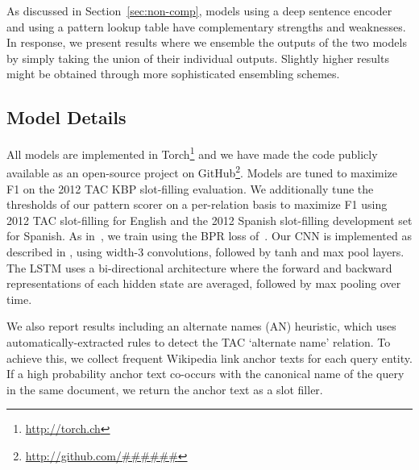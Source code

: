 
As discussed in Section~\ref{sec:non-comp}, models using a deep sentence encoder and using a pattern lookup table have complementary strengths and weaknesses. In response, we present results where we ensemble the outputs of the two models by simply taking the union of their individual outputs. Slightly higher results might be obtained through more sophisticated ensembling schemes. %


\subsection {Model Details \label{sec:models}}
All models are implemented in Torch\footnote{\url{http://torch.ch}} and we have made the code publicly available as an open-source project on GitHub\footnote{\url{http://github.com/######}}. Models are tuned to maximize F1 on the 2012 TAC KBP slot-filling evaluation. We additionally tune the thresholds of our pattern scorer on a per-relation basis to maximize F1 using 2012 TAC slot-filling for English and the 2012 Spanish slot-filling development set for Spanish. As in~\citet{limin}, we train using the BPR loss of~\citet{rendle2009bpr}. Our CNN is implemented as described in \citet{toutanova2015representing}, using width-3 convolutions, followed by tanh and max pool layers. The LSTM uses a bi-directional architecture where the forward and backward representations of each hidden state are averaged, followed by max pooling over time.

We also report results including an alternate names (AN) heuristic, which uses automatically-extracted rules to detect the TAC `alternate name' relation. To achieve this, we collect frequent Wikipedia link anchor texts for each query entity.
If a high probability anchor text co-occurs with the canonical name of the query in the same document, we return the anchor text as a slot filler.